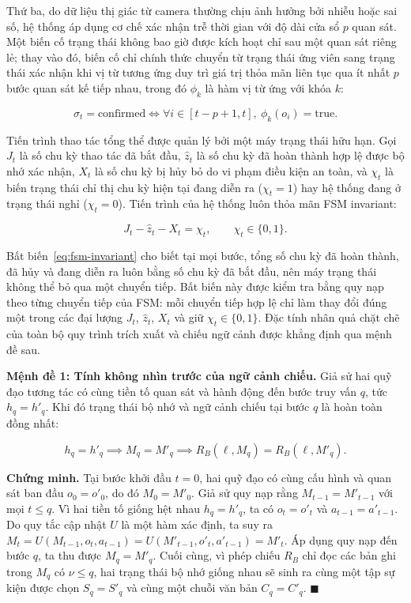 Thứ ba, do dữ liệu thị giác từ camera thường chịu ảnh hưởng bởi nhiễu hoặc sai số, hệ thống áp dụng cơ chế xác nhận trễ thời gian với độ dài cửa sổ $p$ quan sát. Một biến cố trạng thái không bao giờ được kích hoạt chỉ sau một quan sát riêng lẻ; thay vào đó, biến cố chỉ chính thức chuyển từ trạng thái ứng viên sang trạng thái xác nhận khi vị từ tương ứng duy trì giá trị thỏa mãn liên tục qua ít nhất $p$ bước quan sát kế tiếp nhau, trong đó $\phi_k$ là hàm vị từ ứng với khóa $k$:

\begin{equation}
\sigma_t = \text{confirmed} \iff \forall i \in [t - p + 1, t],\ \phi_k(o_i) = \text{true}.
\label{eq:temporal-hysteresis}
\end{equation}

Tiến trình thao tác tổng thể được quản lý bởi một máy trạng thái hữu hạn. Gọi $J_t$ là số chu kỳ thao tác đã bắt đầu, $\hat z_t$ là số chu kỳ đã hoàn thành hợp lệ được bộ nhớ xác nhận, $X_t$ là số chu kỳ bị hủy bỏ do vi phạm điều kiện an toàn, và $\chi_t$ là biến trạng thái chỉ thị chu kỳ hiện tại đang diễn ra ($\chi_t = 1$) hay hệ thống đang ở trạng thái nghỉ ($\chi_t = 0$). Tiến trình của hệ thống luôn thỏa mãn FSM invariant:

\begin{equation}
J_t - \hat z_t - X_t = \chi_t,\qquad \chi_t \in \{0, 1\}.
\label{eq:fsm-invariant}
\end{equation}

Bất biến~\eqref{eq:fsm-invariant} cho biết tại mọi bước, tổng số chu kỳ đã hoàn thành, đã hủy và đang diễn ra luôn bằng số chu kỳ đã bắt đầu, nên máy trạng thái không thể bỏ qua một chuyển tiếp. Bất biến này được kiểm tra bằng quy nạp theo từng chuyển tiếp của FSM: mỗi chuyển tiếp hợp lệ chỉ làm thay đổi đúng một trong các đại lượng $J_t$, $\hat z_t$, $X_t$ và giữ $\chi_t \in \{0,1\}$. Đặc tính nhân quả chặt chẽ của toàn bộ quy trình trích xuất và chiếu ngữ cảnh được khẳng định qua mệnh đề sau.

\textbf{Mệnh đề 1: Tính không nhìn trước của ngữ cảnh chiếu.} Giả sử hai quỹ đạo tương tác có cùng tiền tố quan sát và hành động đến bước truy vấn $q$, tức $h_q = h'_q$. Khi đó trạng thái bộ nhớ và ngữ cảnh chiếu tại bước $q$ là hoàn toàn đồng nhất:

\begin{equation}
h_q = h'_q \implies M_q = M'_q \implies R_B(\ell, M_q) = R_B(\ell, M'_q).
\label{eq:non-anticipatory}
\end{equation}

\textbf{Chứng minh.} Tại bước khởi đầu $t=0$, hai quỹ đạo có cùng cấu hình và quan sát ban đầu $o_0 = o'_0$, do đó $M_0 = M'_0$. Giả sử quy nạp rằng $M_{t-1} = M'_{t-1}$ với mọi $t \le q$. Vì hai tiền tố giống hệt nhau $h_q = h'_q$, ta có $o_t = o'_t$ và $a_{t-1} = a'_{t-1}$. Do quy tắc cập nhật $U$ là một hàm xác định, ta suy ra $M_t = U(M_{t-1}, o_t, a_{t-1}) = U(M'_{t-1}, o'_t, a'_{t-1}) = M'_t$. Áp dụng quy nạp đến bước $q$, ta thu được $M_q = M'_q$. Cuối cùng, vì phép chiếu $R_B$ chỉ đọc các bản ghi trong $M_q$ có $\nu \le q$, hai trạng thái bộ nhớ giống nhau sẽ sinh ra cùng một tập sự kiện được chọn $S_q = S'_q$ và cùng một chuỗi văn bản $C_q = C'_q$. $\blacksquare$

